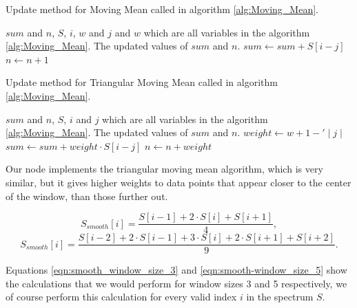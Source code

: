 \documentclass[11pt,openany]{book}
\begin{document}
\begin{algorithm}
    \begin{algorithmic}
        \label{alg:Smooth_update_moving_mean}
        \caption{Update method for Moving Mean called in algorithm \ref{alg:Moving_Mean}.}
        \Require $sum$ and $n$, $S$, $i$, $w$ and $j$ and $w$ which are all variables in the algorithm \ref{alg:Moving_Mean}.
        \Ensure The updated values of $sum$ and $n$.
            \State $sum \gets sum + S[i - j]$
            \State $n \gets n + 1$
        \EndProcedure
    \end{algorithmic}
\end{algorithm}

\begin{algorithm}
    \begin{algorithmic}
        \label{alg:Smooth_update_triangular_moving_mean}
        \caption{Update method for Triangular Moving Mean called in algorithm \ref{alg:Moving_Mean}.}
        \Require $sum$ and $n$, $S$, $i$ and $j$ which are all variables in the algorithm \ref{alg:Moving_Mean}.
        \Ensure The updated values of $sum$ and $n$.
            \State $weight \gets w + 1 - '\mid j \mid$
            \State $sum \gets sum + weight \cdot S[i - j]$
            \State $n \gets n + weight$
        \EndProcedure
    \end{algorithmic}
\end{algorithm}

Our node implements the triangular moving mean algorithm, which is very similar, but it gives higher weights to data points that appear closer to the center of the window, than those further out.

\begin{equation}
    S_{smooth}[i] = \frac{S[i-1] + 2\cdot S[i] + S[i+1]}{4},
    \label{eqn:smooth_window_size_3}
\end{equation}
\begin{equation}
    S_{smooth}[i] = \frac{S[i-2] + 2\cdot S[i-1] + 3\cdot S[i] + 2\cdot S[i+1] + S[i+2]}{9}.
    \label{eqn:smooth-window_size_5}
\end{equation}

Equations \ref{eqn:smooth_window_size_3} and \ref{eqn:smooth-window_size_5} show the calculations that we would perform for window sizes 3 and 5 respectively, we of course perform this calculation for every valid index $i$ in the spectrum $S$.
\end{document}
